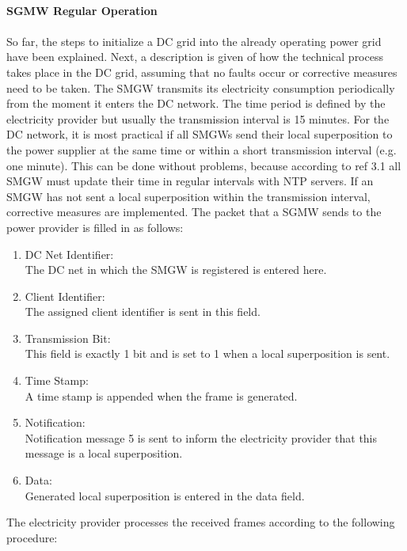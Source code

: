 \\
\textbf{SGMW Regular Operation}
\\
\\
So far, the steps to initialize a DC grid into the already operating power grid have been explained. Next, a description is given of how the technical process takes place in the DC grid, assuming that no faults occur or corrective measures need to be taken. The SMGW transmits its electricity consumption periodically from the moment it enters the DC network. The time period is defined by the electricity provider but usually the transmission interval is 15 minutes. For the DC network, it is most practical if all SMGWs send their local superposition to the power supplier at the same time or within a short transmission interval (e.g. one minute). This can be done without problems, because according to ref 3.1 all SMGW must update their time in regular intervals with NTP servers. If an SMGW has not sent a local superposition within the transmission interval, corrective measures are implemented. The packet that a SGMW sends to the power provider is filled in as follows:
\begin{enumerate}
\item DC Net Identifier:\\
The DC net in which the SMGW is registered is entered here.
\item Client Identifier:\\ 
The assigned client identifier is sent in this field.
\item Transmission Bit:\\
This field is exactly 1 bit and is set to 1 when a local superposition is sent.
\item Time Stamp:\\
A time stamp is appended when the frame is generated.
\item Notification:\\
Notification message 5 is sent to inform the electricity provider that this message is a local superposition.
\item Data:\\
Generated local superposition is entered in the data field.
\end{enumerate}
The electricity provider processes the received frames according to the following procedure:\\
